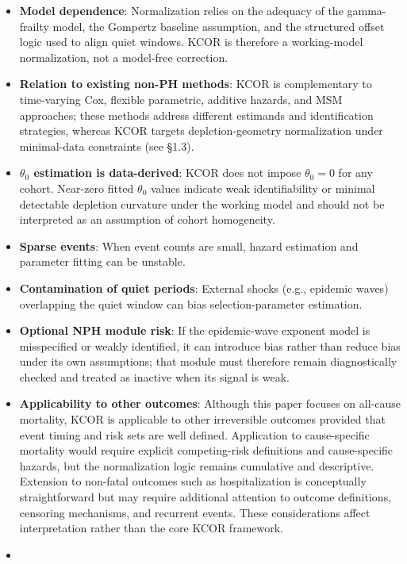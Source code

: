 \documentclass[
]{article}
\providecommand{\tightlist}{%
  \setlength{\itemsep}{0pt}\setlength{\parskip}{0pt}}
\begin{document}
\begin{itemize}
\tightlist
\item
  \textbf{Model dependence}: Normalization relies on the adequacy of the
  gamma-frailty model, the Gompertz baseline assumption, and the
  structured offset logic used to align quiet windows. KCOR is therefore
  a working-model normalization, not a model-free correction.
\item
  \textbf{Relation to existing non-PH methods}: KCOR is complementary to
  time-varying Cox, flexible parametric, additive hazards, and MSM
  approaches; these methods address different estimands and
  identification strategies, whereas KCOR targets depletion-geometry
  normalization under minimal-data constraints (see §1.3).
\item
  \textbf{\(\theta_0\) estimation is data-derived}: KCOR does not impose
  \(\theta_0 = 0\) for any cohort. Near-zero fitted \(\theta_0\) values
  indicate weak identifiability or minimal detectable depletion
  curvature under the working model and should not be interpreted as an
  assumption of cohort homogeneity.
\item
  \textbf{Sparse events}: When event counts are small, hazard estimation
  and parameter fitting can be unstable.
\item
  \textbf{Contamination of quiet periods}: External shocks (e.g.,
  epidemic waves) overlapping the quiet window can bias
  selection-parameter estimation.
\item
  \textbf{Optional NPH module risk}: If the epidemic-wave exponent model
  is misspecified or weakly identified, it can introduce bias rather
  than reduce bias under its own assumptions; that module must therefore
  remain diagnostically checked and treated as inactive when its signal
  is weak.
\item
  \textbf{Applicability to other outcomes}: Although this paper focuses
  on all-cause mortality, KCOR is applicable to other irreversible
  outcomes provided that event timing and risk sets are well defined.
  Application to cause-specific mortality would require explicit
  competing-risk definitions and cause-specific hazards, but the
  normalization logic remains cumulative and descriptive. Extension to
  non-fatal outcomes such as hospitalization is conceptually
  straightforward but may require additional attention to outcome
  definitions, censoring mechanisms, and recurrent events. These
  considerations affect interpretation rather than the core KCOR
  framework.
\item

\end{itemize}
\end{document}
